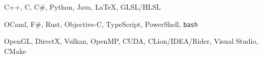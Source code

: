 \begin{cvskills}
	{C++, C, C\#, Python, Java, \LaTeX{}, GLSL/HLSL} %


	{OCaml, F\#, Rust, Objective-C, TypeScript, PowerShell, \texttt{bash}} %


	{OpenGL, DirectX, Vulkan, OpenMP, CUDA, CLion/IDEA/Rider, Visual Studio, CMake} %

\end{cvskills}
